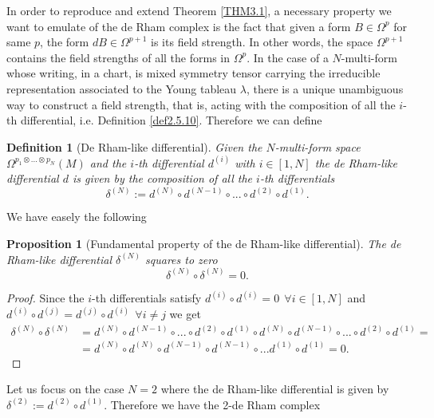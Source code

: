 \documentclass[a4paper,12pt]{article}
\newtheorem{Definition}{Definition}[section]
\newtheorem{Proposition}{Proposition}[section]
\begin{document}
In order to reproduce and extend Theorem \ref{THM3.1}, a necessary property we want to emulate of the de Rham complex is the fact that given a form $B \in \Omega^p$ for same $p$, the form $dB \in \Omega^{p+1}$ is its field strength. In other words, the space $\Omega^{p+1}$ contains the field strengths of all the forms in $\Omega^{p}$. In the case of a $N$-multi-form whose writing, in a chart, is mixed symmetry tensor carrying the irreducible representation associated to the Young tableau $\lambda$, there is a unique unambiguous way to construct a field strength, that is, acting with the composition of all the $i$-th differential, i.e. Definition \ref{def2.5.10}. Therefore we can define
\begin{Definition}[De Rham-like differential]
    Given the $N$-multi-form space $\Omega^{p_1 \otimes ... \otimes p_N}(M)$ and the $i$-th differential $d^{(i)}$ with $i \in [1,N]$ the de Rham-like differential $d$ is given by the composition of all the $i$-th differentials
    \begin{equation}
        \delta^{(N)}:=d^{(N)} \circ d^{(N-1)} \circ ... \circ d^{(2)} \circ d^{(1)}.
    \end{equation}
\end{Definition}
We have easely the following
\begin{Proposition}[Fundamental property of the de Rham-like differential]
    The de Rham-like differential $\delta^{(N)}$ squares to zero
    \begin{equation}
        \delta^{(N)} \circ \delta^{(N)} =0.
    \end{equation}
\end{Proposition}
\begin{proof}
    Since the $i$-th differentials satisfy $d^{(i)} \circ d^{(i)}=0 \ \ \forall i \in [1,N]$ and $d^{(i)} \circ d^{(j)}=d^{(j)} \circ d^{(i)} \ \ \forall i \neq j$ we get
    \begin{equation}
    \begin{aligned}
        \delta^{(N)} \circ \delta^{(N)}&=d^{(N)} \circ d^{(N-1)} \circ ... \circ d^{(2)} \circ d^{(1)} \circ d^{(N)} \circ d^{(N-1)} \circ ... \circ d^{(2)} \circ d^{(1)}=\\
        &=d^{(N)} \circ d^{(N)} \circ d^{(N-1)} \circ d^{(N-1)} \circ ... d^{(1)} \circ d^{(1)} =0.
    \end{aligned}
    \end{equation}
\end{proof}
Let us focus on the case $N=2$ where the de Rham-like differential is given by $\delta^{(2)}:=d^{(2)}\circ d^{(1)}$. Therefore we have the 2-de Rham complex
\end{document}
